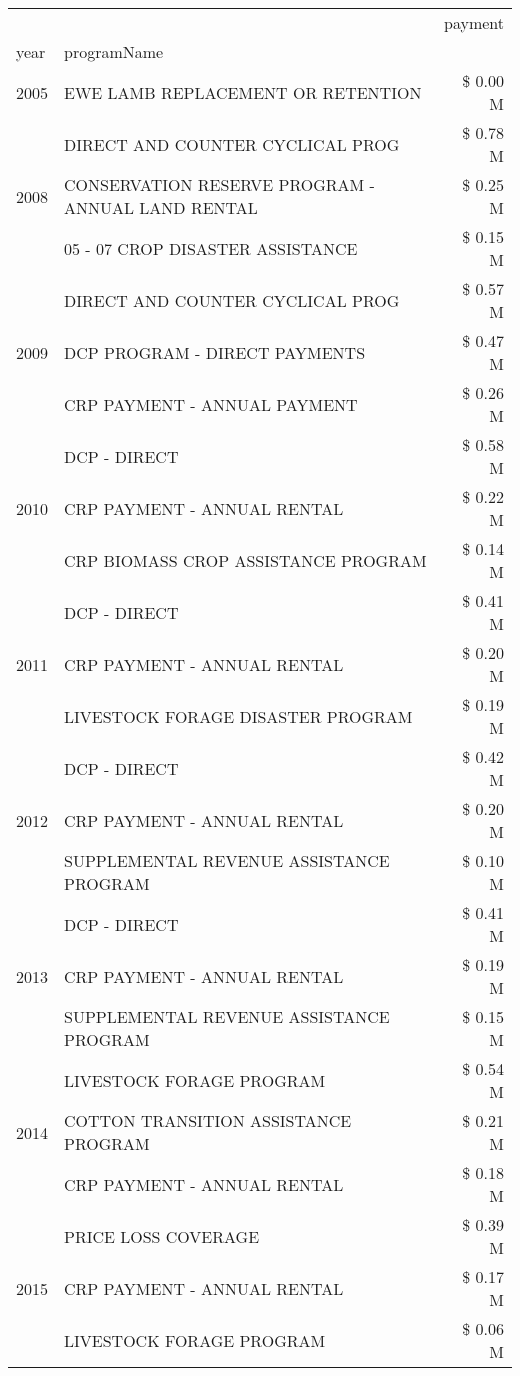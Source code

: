 \begin{tabular}{llr}
\toprule
 &  & payment \\
year & programName &  \\
\midrule
2005 & EWE LAMB REPLACEMENT OR RETENTION & \$ 0.00 M \\
\cline{1-3}
\multirow[t]{3}{*}{2008} & DIRECT AND COUNTER CYCLICAL PROG & \$ 0.78 M \\
 & CONSERVATION RESERVE PROGRAM - ANNUAL LAND RENTAL & \$ 0.25 M \\
 & 05 - 07 CROP DISASTER ASSISTANCE & \$ 0.15 M \\
\cline{1-3}
\multirow[t]{3}{*}{2009} & DIRECT AND COUNTER CYCLICAL PROG & \$ 0.57 M \\
 & DCP PROGRAM - DIRECT PAYMENTS & \$ 0.47 M \\
 & CRP PAYMENT - ANNUAL PAYMENT & \$ 0.26 M \\
\cline{1-3}
\multirow[t]{3}{*}{2010} & DCP - DIRECT & \$ 0.58 M \\
 & CRP PAYMENT - ANNUAL RENTAL & \$ 0.22 M \\
 & CRP BIOMASS CROP ASSISTANCE PROGRAM & \$ 0.14 M \\
\cline{1-3}
\multirow[t]{3}{*}{2011} & DCP - DIRECT & \$ 0.41 M \\
 & CRP PAYMENT - ANNUAL RENTAL & \$ 0.20 M \\
 & LIVESTOCK FORAGE DISASTER PROGRAM & \$ 0.19 M \\
\cline{1-3}
\multirow[t]{3}{*}{2012} & DCP - DIRECT & \$ 0.42 M \\
 & CRP PAYMENT - ANNUAL RENTAL & \$ 0.20 M \\
 & SUPPLEMENTAL REVENUE ASSISTANCE PROGRAM & \$ 0.10 M \\
\cline{1-3}
\multirow[t]{3}{*}{2013} & DCP - DIRECT & \$ 0.41 M \\
 & CRP PAYMENT - ANNUAL RENTAL & \$ 0.19 M \\
 & SUPPLEMENTAL REVENUE ASSISTANCE PROGRAM & \$ 0.15 M \\
\cline{1-3}
\multirow[t]{3}{*}{2014} & LIVESTOCK FORAGE PROGRAM & \$ 0.54 M \\
 & COTTON TRANSITION ASSISTANCE PROGRAM & \$ 0.21 M \\
 & CRP PAYMENT - ANNUAL RENTAL & \$ 0.18 M \\
\cline{1-3}
\multirow[t]{3}{*}{2015} & PRICE LOSS COVERAGE & \$ 0.39 M \\
 & CRP PAYMENT - ANNUAL RENTAL & \$ 0.17 M \\
 & LIVESTOCK FORAGE PROGRAM & \$ 0.06 M \\

\end{tabular}
